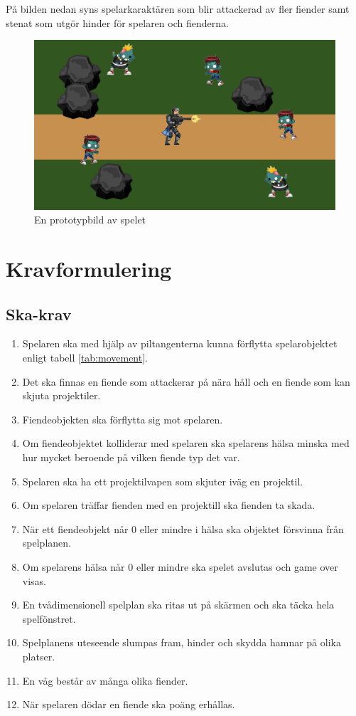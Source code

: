 \documentclass{TDP005mall}
\begin{document}
  På bilden nedan syns spelarkaraktären som blir attackerad av fler fiender samt stenat som utgör hinder för spelaren och fienderna.

  \begin{figure}[H]
    \includegraphics[width=\linewidth]{test.png}
    \caption {En prototypbild av spelet}
    \label {fig:picture}
  \end {figure}

  \section{Kravformulering}
  \subsection{Ska-krav}
  \begin{enumerate}[label=S\arabic*]
    \item Spelaren ska med hjälp av piltangenterna kunna förflytta spelarobjektet enligt tabell \ref{tab:movement}.
    \item Det ska finnas en fiende som attackerar på nära håll och en fiende som kan skjuta projektiler.
    \item Fiendeobjekten ska förflytta sig mot spelaren.
    \item Om fiendeobjektet kolliderar med spelaren ska spelarens hälsa minska med hur mycket beroende på vilken fiende typ det var.
    \item Spelaren ska ha ett projektilvapen som skjuter iväg en projektil.
    \item Om spelaren träffar fienden med en projektill ska fienden ta skada.
    \item När ett fiendeobjekt når 0 eller mindre i hälsa ska objektet försvinna från spelplanen.
    \item Om spelarens hälsa når 0 eller mindre ska spelet avslutas och game over visas.
    \item En tvådimensionell spelplan ska ritas ut på skärmen och ska täcka hela spelfönstret.
    \item Spelplanens uteseende slumpas fram, hinder och skydda hamnar på olika platser.
    \item En våg består av många olika fiender.
    \item När spelaren dödar en fiende ska poäng erhållas.
  \end{enumerate}
\end{document}
